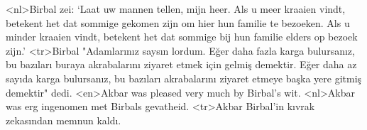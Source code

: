 <nl>Birbal zei: `Laat uw mannen tellen, mijn heer. Als u meer kraaien vindt, betekent het dat sommige gekomen zijn om hier  hun familie te bezoeken. Als u minder kraaien vindt, betekent het dat sommige bij hun familie elders op bezoek zijn.'
<tr>Birbal "Adamlarınız saysın lordum. Eğer daha fazla karga bulursanız, bu bazıları buraya akrabalarını ziyaret etmek için gelmiş demektir. Eğer daha az sayıda karga bulursanız, bu bazıları akrabalarını ziyaret etmeye başka yere gitmiş demektir" dedi.
<en>Akbar was pleased very much by Birbal's wit. 
<nl>Akbar was erg ingenomen met Birbals gevatheid.
<tr>Akbar Birbal'in kıvrak zekasından memnun kaldı.

